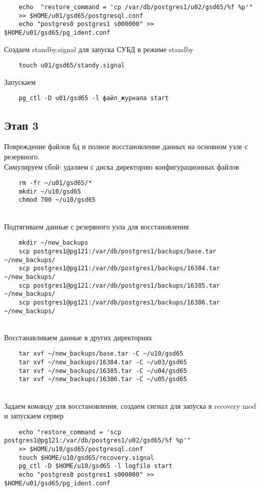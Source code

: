 \documentclass{article}
\begin{document}
\begin{verbatim}
    echo  "restore_command = 'cp /var/db/postgres1/u02/gsd65/%f %p'" 
    >> $HOME/u01/gsd65/postgresql.conf
    echo "postgres0 postgres1 s000000" >> $HOME/u01/gsd65/pg_ident.conf 
\end{verbatim}
Создаем standby.signal для запуска СУБД в режиме standby
\begin{verbatim}
    touch u01/gsd65/standy.signal
\end{verbatim}
Запускаем
\begin{verbatim}
    pg_ctl -D u01/gsd65 -l файл_журнала start
\end{verbatim}

\subsection{Этап 3}
Повреждение файлов бд и полное восстановление данных на основном узле с резервного. \\
Симулируем сбой: удаляем с диска директорию конфигурационных файлов
\begin{verbatim}
    rm -fr ~/u01/gsd65/*
    mkdir ~/u10/gsd65
    chmod 700 ~/u10/gsd65
\end{verbatim} \\
Подтягиваем данные с резервного узла для восстановления
\begin{verbatim}
    mkdir ~/new_backups
    scp postgres1@pg121:/var/db/postgres1/backups/base.tar ~/new_backups/
    scp postgres1@pg121:/var/db/postgres1/backups/16384.tar ~/new_backups/
    scp postgres1@pg121:/var/db/postgres1/backups/16385.tar ~/new_backups/
    scp postgres1@pg121:/var/db/postgres1/backups/16386.tar ~/new_backups/
\end{verbatim} \\
Восстанавливаем данные в других директориях
\begin{verbatim}
    tar xvf ~/new_backups/base.tar -C ~/u10/gsd65
    tar xvf ~/new_backups/16384.tar -C ~/u03/gsd65
    tar xvf ~/new_backups/16385.tar -C ~/u04/gsd65
    tar xvf ~/new_backups/16386.tar -C ~/u05/gsd65
\end{verbatim} \\
Задаем команду для восстановления, создаем сигнал для запуска в recovery mod и запускаем сервер
\begin{verbatim}
    echo "restore_command = 'scp postgres1@pg121:/var/db/postgres1/u02/gsd65/%f %p'"
    >> $HOME/u10/gsd65/postgresql.conf
    touch $HOME/u10/gsd65/recovery.signal
    pg_ctl -D $HOME/u10/gsd65 -l logfile start
    echo "postgres0 postgres1 s000000" >> $HOME/u01/gsd65/pg_ident.conf 
\end{verbatim}
\end{document}
